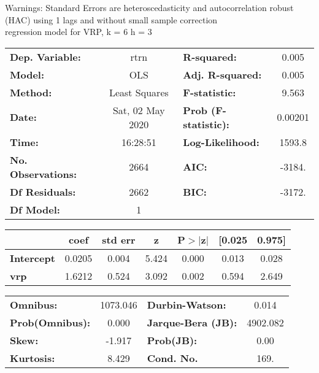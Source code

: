 Warnings: \newline
 [1] Standard Errors are heteroscedasticity and autocorrelation robust (HAC) using 1 lags and without small sample correction\\ 

regression model for VRP, k = 6 h = 3\begin{center}
\begin{tabular}{lclc}
\toprule
\textbf{Dep. Variable:}    &       rtrn       & \textbf{  R-squared:         } &     0.005   \\
\textbf{Model:}            &       OLS        & \textbf{  Adj. R-squared:    } &     0.005   \\
\textbf{Method:}           &  Least Squares   & \textbf{  F-statistic:       } &     9.563   \\
\textbf{Date:}             & Sat, 02 May 2020 & \textbf{  Prob (F-statistic):} &  0.00201    \\
\textbf{Time:}             &     16:28:51     & \textbf{  Log-Likelihood:    } &    1593.8   \\
\textbf{No. Observations:} &        2664      & \textbf{  AIC:               } &    -3184.   \\
\textbf{Df Residuals:}     &        2662      & \textbf{  BIC:               } &    -3172.   \\
\textbf{Df Model:}         &           1      & \textbf{                     } &             \\
\bottomrule
\end{tabular}
\begin{tabular}{lcccccc}
                   & \textbf{coef} & \textbf{std err} & \textbf{z} & \textbf{P$> |$z$|$} & \textbf{[0.025} & \textbf{0.975]}  \\
\midrule
\textbf{Intercept} &       0.0205  &        0.004     &     5.424  &         0.000        &        0.013    &        0.028     \\
\textbf{vrp}       &       1.6212  &        0.524     &     3.092  &         0.002        &        0.594    &        2.649     \\
\bottomrule
\end{tabular}
\begin{tabular}{lclc}
\textbf{Omnibus:}       & 1073.046 & \textbf{  Durbin-Watson:     } &    0.014  \\
\textbf{Prob(Omnibus):} &   0.000  & \textbf{  Jarque-Bera (JB):  } & 4902.082  \\
\textbf{Skew:}          &  -1.917  & \textbf{  Prob(JB):          } &     0.00  \\
\textbf{Kurtosis:}      &   8.429  & \textbf{  Cond. No.          } &     169.  \\
\bottomrule
\end{tabular}
\end{center}

